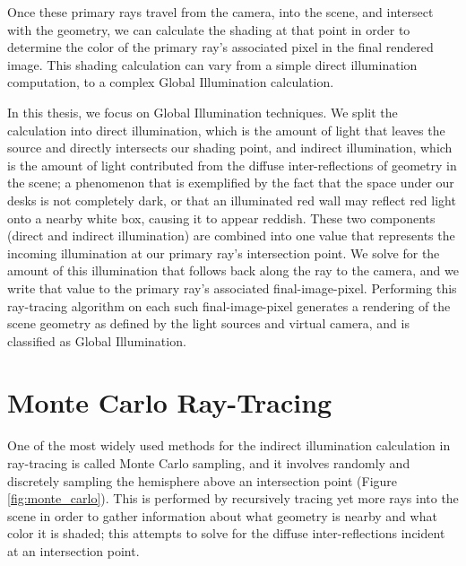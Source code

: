 Once these primary rays travel from the camera, into the scene, and intersect with the geometry, we can calculate the shading at that point in order to determine the color of the primary ray's associated pixel in the final rendered image. This shading calculation can vary from a simple direct illumination computation, to a complex Global Illumination calculation.

In this thesis, we focus on Global Illumination techniques. We split the calculation into direct illumination, which is the amount of light that leaves the source and directly intersects our shading point, and indirect illumination, which is the amount of light contributed from the diffuse inter-reflections of geometry in the scene; a phenomenon that is exemplified by the fact that the space under our desks is not completely dark, or that an illuminated red wall may reflect red light onto a nearby white box, causing it to appear reddish. These two components (direct and indirect illumination) are combined into one value that represents the incoming illumination at our primary ray's intersection point. We solve for the amount of this illumination that follows back along the ray to the camera, and we write that value to the primary ray's associated final-image-pixel. Performing this ray-tracing algorithm on each such final-image-pixel generates a rendering of the scene geometry as defined by the light sources and virtual camera, and is classified as Global Illumination.

\section{Monte Carlo Ray-Tracing}
One of the most widely used methods for the indirect illumination calculation in ray-tracing is called Monte Carlo sampling, and it involves randomly and discretely sampling the hemisphere above an intersection point (Figure \ref{fig:monte_carlo}). This is performed by recursively tracing yet more rays into the scene in order to gather information about what geometry is nearby and what color it is shaded; this attempts to solve for the diffuse inter-reflections incident at an intersection point. 

